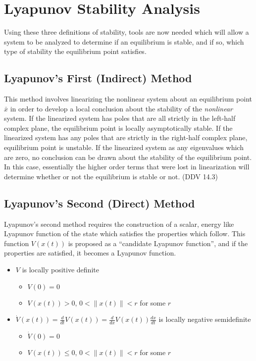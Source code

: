 \section{Lyapunov Stability Analysis}

Using these three definitions of stability, tools are now needed which will allow a system to be analyzed to determine if an equilibrium is stable, and if so, which type of stability the equilibrium point satisfies.

\subsection{Lyapunov's First (Indirect) Method}

This method involves linearizing the nonlinear system about an equilibrium point $\bar{x}$ in order to develop a local conclusion about the stability of the \textit{nonlinear} system.
If the linearized system has poles that are all strictly in the left-half complex plane, the equilibrium point is locally asymptotically stable.
If the linearized system has any poles that are strictly in the right-half complex plane, equilibrium point is unstable.
If the linearized system as any eigenvalues which are zero, no conclusion can be drawn about the stability of the equilibrium point.
In this case, essentially the higher order terms that were lost in linearization will determine whether or not the equilibrium is stable or not.
(DDV 14.3)

\subsection{Lyapunov's Second (Direct) Method}

Lyapunov's second method requires the construction of a scalar, energy like Lyapunov function of the state which satisfies the properties which follow.
This function $V(x(t))$ is proposed as a ``candidate Lyapunov function'', and if the properties are satisfied, it becomes a Lyapunov function.
\begin{itemize}
  \item{$V$ is locally positive definite}
  \begin{itemize}
    \item{$V(0)=0$}
    \item{$V(x(t))>0$, $0<\|x(t)\|<r$ for some $r$}
  \end{itemize}
  \item{$\dot{V}(x(t))=\frac{d}{dt}V(x(t))=\frac{d}{dx}V(x(t))\frac{dx}{dt}$ is locally negative semidefinite}
  \begin{itemize}
    \item{$\dot{V}(0)=0$}
    \item{$V(x(t))\leq0$, $0<\|x(t)\|<r$ for some $r$}
  \end{itemize}
\end{itemize}

